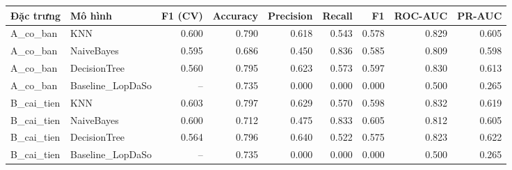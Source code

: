 \begin{tabular}{llrrrrrrr}
\toprule
Đặc trưng & Mô hình & F1 (CV) & Accuracy & Precision & Recall & F1 & ROC-AUC & PR-AUC \\
\midrule
A\_co\_ban & KNN & 0.600 & 0.790 & 0.618 & 0.543 & 0.578 & 0.829 & 0.605 \\
A\_co\_ban & NaiveBayes & 0.595 & 0.686 & 0.450 & 0.836 & 0.585 & 0.809 & 0.598 \\
A\_co\_ban & DecisionTree & 0.560 & 0.795 & 0.623 & 0.573 & 0.597 & 0.830 & 0.613 \\
A\_co\_ban & Baseline\_LopDaSo & -- & 0.735 & 0.000 & 0.000 & 0.000 & 0.500 & 0.265 \\
B\_cai\_tien & KNN & 0.603 & 0.797 & 0.629 & 0.570 & 0.598 & 0.832 & 0.619 \\
B\_cai\_tien & NaiveBayes & 0.600 & 0.712 & 0.475 & 0.833 & 0.605 & 0.812 & 0.605 \\
B\_cai\_tien & DecisionTree & 0.564 & 0.796 & 0.640 & 0.522 & 0.575 & 0.823 & 0.622 \\
B\_cai\_tien & Baseline\_LopDaSo & -- & 0.735 & 0.000 & 0.000 & 0.000 & 0.500 & 0.265 \\
\bottomrule
\end{tabular}

